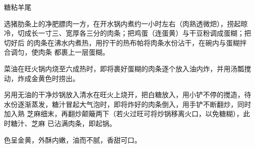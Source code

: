%
%
%
%
%
%
%
\begin{recipe}{糖粘羊尾}

\ingredients


\preparation

\step 选猪肋条上的净肥膘肉一方，在开水锅内煮约一小时左右（肉熟透微𤆵），捞起晾
冷，切成长一寸三、宽厚各三分的肉条；把鸡蛋（连蛋黄）与干豆粉调成蛋糊；把切好后
的肉条在沸水内煮热，用拧干的热布帕将肉条水份沾干，在碗内与蛋糊拌合调匀，使肉条
都裹上一层蛋糊。

\step 菜油在旺火锅内烧至六成热时，即将裹好蛋糊的肉条逐个放入油内炸，并用汤瓢搅
动，炸成金黄色时捞出。

\step 另用无油的干净炒锅放入清水在旺火上烧开，把白糖放入，用小铲不停的搅造，待
水份逐渐蒸发，糖汁冒起大气泡时，即将炸好的肉条倒入，用手铲不断翻炒，同时加入熟
芝麻细末，再翻炒颠簸两下（若火过旺可将炒锅移离火口，以免糖糊），此时糖汁、芝麻
已沾满肉条，即起锅。

\features

色呈金黄，外酥内嫩，油而不腻，香甜可口。

\end{recipe}

